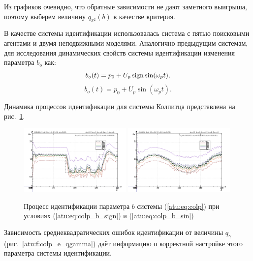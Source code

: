 Из графиков очевидно, что
обратные зависимости не дают заметного выигрыша, поэтому выберем
величину $ q_{x^2}(b) $ в качестве критерия.

В качестве системы идентификации использовалась система с пятью поисковыми агентами и
двумя неподвижными моделями. Аналогично предыдущим системам,
для исследования динамических свойств системы идентификации
изменения параметра $b_o$ как:
%
\begin{equation}
 b_o(t) = p_0 + U_p \operatorname*{sign} \sin( \omega_p t ),
  \label{atu:eq:colp_b_sign}
\end{equation}
%
\begin{equation}
 b_o(t) = p_0 + U_p \sin( \omega_p t ).
  \label{atu:eq:colp_b_sin}
\end{equation}

Динамика процессов идентификации для системы Колпитца представлена на рис.~\ref{atu:f:colp_id}.

\begin{figure}[htb!]
\centerline{
  \includegraphics[width=0.49\textwidth]{p/cha/colp/colp_m5p-pl_n_sign.png}
  \includegraphics[width=0.49\textwidth]{p/cha/colp/colp_m5p-pl_n_sin.png}
}
\caption{Процесс идентификации параметра $b$ системы (\ref{atu:eq:colp})
  при условиях (\ref{atu:eq:colp_b_sign}) и (\ref{atu:eq:colp_b_sin})
}
\label{atu:f:colp_id}
\end{figure}

Зависимость среднеквадратических ошибок идентификации от величины $q_\gamma$ (рис.~\ref{atu:f:colp_e_qgamma})
даёт информацию о корректной настройке этого параметра системы идентификации.

